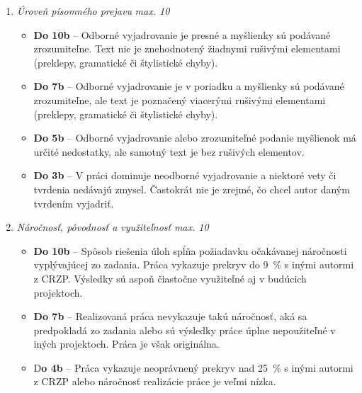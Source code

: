 \begin{enumerate}[label=\textbf{\arabic*.}]
\begin{enumerate}
        \item \textit{Úroveň písomného prejavu} \hfill \textit{max. 10}
        \begin{itemize}
            \item \textbf{Do 10b} – Odborné vyjadrovanie je presné a myšlienky sú podávané zrozumiteľne. Text nie je znehodnotený žiadnymi rušivými elementami (preklepy, gramatické či štylistické chyby). 
            \item \textbf{Do 7b} – Odborné vyjadrovanie je v poriadku a myšlienky sú podávané zrozumiteľne, ale text je poznačený viacerými rušivými elementami (preklepy, gramatické či štylistické chyby). 
            \item \textbf{Do 5b} – Odborné vyjadrovanie alebo zrozumiteľné podanie myšlienok má určité nedostatky, ale samotný text je bez rušivých elementov. 
            \item \textbf{Do 3b} – V práci dominuje neodborné vyjadrovanie a niektoré vety či tvrdenia nedávajú zmysel. Častokrát nie je zrejmé, čo chcel autor daným tvrdením vyjadriť. 
        \end{itemize}

        \item \textit{Náročnosť, pôvodnosť a využiteľnosť}     \hfill \textit{max. 10}
        \begin{itemize}
            \item \textbf{Do 10b} – Spôsob riešenia úloh spĺňa požiadavku očakávanej náročnosti vyplývajúcej zo zadania. Práca vykazuje prekryv do 9\ \% s inými autormi z CRZP. Výsledky sú aspoň čiastočne využiteľné aj v budúcich projektoch. 
            \item \textbf{Do 7b} – Realizovaná práca nevykazuje takú náročnosť, aká sa predpokladá zo zadania alebo sú výsledky práce úplne nepoužiteľné v iných projektoch. Práca je však originálna. 
            \item D\textbf{o 4b} – Práca vykazuje neoprávnený prekryv nad 25\ \% s inými autormi z CRZP alebo náročnosť realizácie práce je veľmi nízka. 
        \end{itemize}
    \end{enumerate}
\end{enumerate}
